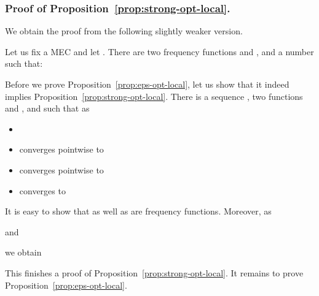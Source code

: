 \medskip
\noindent
\subsubsection{Proof of Proposition~\ref{prop:strong-opt-local}.}\label{app-strong-opt}
We obtain the proof from the following slightly weaker version.
\begin{proposition}\label{prop:eps-opt-local}
Let us fix a MEC  and let . There are two frequency functions  and , and a number  such that:

\end{proposition}
\noindent
Before we prove Proposition~\ref{prop:eps-opt-local}, let us show that it indeed implies Proposition~\ref{prop:strong-opt-local}.
There is a sequence , two functions  and , and  such that as  
\begin{itemize}
\item  
\item  converges pointwise to 
\item  converges pointwise to 
\item  converges to 
\end{itemize}
It is easy to show that  as well as  are frequency functions. Moreover, 
as 

and

we obtain

This finishes a proof of Proposition~\ref{prop:strong-opt-local}. It remains to prove Proposition~\ref{prop:eps-opt-local}.

